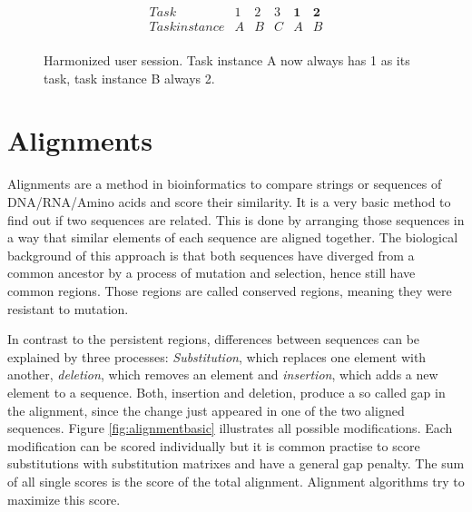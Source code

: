 \begin{figure}
\[
\begin{array}{r|ccccc}
	Task & 1 & 2 & 3 & \textbf{1} & \textbf{2}\\
	\hline
	Task instance & A & B & C & A & B\\
\end{array}
\]
\caption{Harmonized user session. Task instance A now always has 1 as its task, task instance B always 2.}
\label{fig:harmonized}
\end{figure}

\section{Alignments}
\label{sec:alignments}
Alignments are a method in bioinformatics to compare strings or sequences of DNA/RNA/Amino acids and score their similarity.
It is a very basic method to find out if two sequences are related.
This is done by arranging those sequences in a way that similar elements of each sequence are aligned together. The biological background of this approach is that
both sequences have diverged from a common ancestor by a process of mutation and selection\cite{durbin1998}, hence still have common regions. Those regions are called conserved regions, meaning they were resistant to mutation.

In contrast to the persistent regions, differences between sequences can be explained by three processes: \textit{Substitution}, which replaces one element with another,  \textit{deletion}, which removes an element and \textit{insertion}, which adds a new element to a sequence.
Both, insertion and deletion, produce a so called gap in the alignment, since the change just appeared in one of the two aligned sequences. Figure \ref{fig:alignmentbasic} illustrates all possible modifications.
Each modification can be scored individually but it is common practise to score substitutions with substitution matrixes and have a general gap penalty. The sum of all single scores is the score of the total alignment.
Alignment algorithms try to maximize this score.

